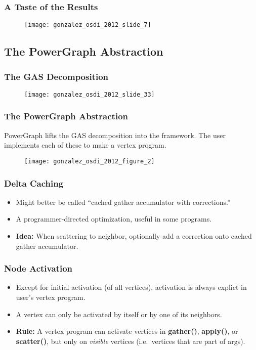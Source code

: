 \begin{frame}
  \frametitle{A Taste of the Results}
  \begin{figure}
    \centering
    \texttt{[image: gonzalez\_osdi\_2012\_slide\_7]}
    \caption{\cite[OSDI '12 Slides]{gonzalez2012powergraph-slides}}
  \end{figure}
\end{frame}


\subsection{The PowerGraph Abstraction}

\begin{frame}
  \frametitle{The GAS Decomposition}
  \begin{figure}
    \centering
    \texttt{[image: gonzalez\_osdi\_2012\_slide\_33]}
    \caption{\cite[OSDI '12 Slides]{gonzalez2012powergraph-slides}}
  \end{figure}
\end{frame}

\begin{frame}
  \frametitle{The PowerGraph Abstraction}
  PowerGraph lifts the GAS decomposition into the framework. The user implements
  each of these to make a vertex program.
  \begin{figure}
    \centering
    \texttt{[image: gonzalez\_osdi\_2012\_figure\_2]}
    \caption{\cite[OSDI '12]{gonzalez2012powergraph}}
  \end{figure}
\end{frame}

\begin{frame}
  \frametitle{Delta Caching}
  \begin{itemize}
    \item Might better be called ``cached gather accumulator with corrections.''
    \item A programmer-directed optimization, useful in some programs.
    \item \textbf{Idea:} When scattering to neighbor, optionally add a
          correction onto cached gather accumulator.
  \end{itemize}
\end{frame}

\begin{frame}
  \frametitle{Node Activation}
  \begin{itemize}
    \item Except for initial activation (of all vertices), activation is always
          explict in user's vertex program.
    \item A vertex can only be activated by itself or by one of its neighbors.
    \item \textbf{Rule:} A vertex program can activate vertices in
          \textbf{gather()}, \textbf{apply()}, or \textbf{scatter()}, but only
          on \textit{visible} vertices (i.e.\ vertices that are part of args).
  \end{itemize}
\end{frame}

